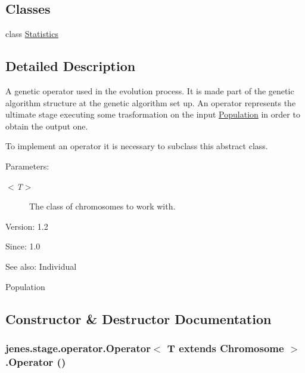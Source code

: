 \subsection*{Classes}
\begin{CompactItemize}
\item 
class \hyperlink{classjenes_1_1stage_1_1operator_1_1_operator_3_01_t_01extends_01_chromosome_01_4_1_1_statistics}{Statistics}
\end{CompactItemize}


\subsection{Detailed Description}
A genetic operator used in the evolution process. It is made part of the genetic algorithm structure at the genetic algorithm set up. An operator represents the ultimate stage executing some trasformation on the input \hyperlink{}{Population} in order to obtain the output one. 

To implement an operator it is necessary to subclass this abstract class.

\begin{Desc}
\item[Parameters:]
\begin{description}
\item[{\em $<$T$>$}]The class of chromosomes to work with.\end{description}
\end{Desc}
\begin{Desc}
\item[Version:]1.2 \end{Desc}
\begin{Desc}
\item[Since:]1.0\end{Desc}
\begin{Desc}
\item[See also:]Individual 

Population \end{Desc}


\subsection{Constructor \& Destructor Documentation}
\hypertarget{classjenes_1_1stage_1_1operator_1_1_operator_3_01_t_01extends_01_chromosome_01_4_23b4b18468c2fa30bd89fa9e962f6eb8}{
\subsubsection[Operator]{\setlength{\rightskip}{0pt plus 5cm}jenes.stage.operator.Operator$<$ T extends Chromosome $>$.Operator ()}}
\label{classjenes_1_1stage_1_1operator_1_1_operator_3_01_t_01extends_01_chromosome_01_4_23b4b18468c2fa30bd89fa9e962f6eb8}


